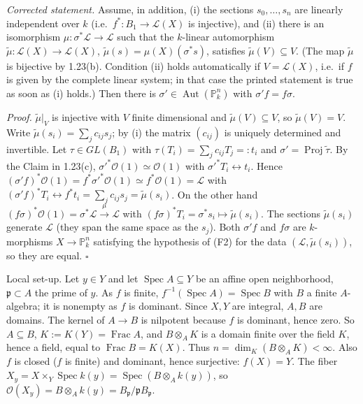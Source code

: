 \documentclass[11pt]{article}
\begin{document}
\emph{Corrected statement.} Assume, in addition, (i) the sections $s_0,\dots,s_n$ are linearly independent over $k$ (i.e.\ $f^*:B_1\to\mathcal{L}(X)$ is injective), and (ii) there is an isomorphism $\mu:\sigma^*\mathcal{L}\to\mathcal{L}$ such that the $k$-linear automorphism $\tilde\mu:\mathcal{L}(X)\to\mathcal{L}(X)$, $\tilde\mu(s)=\mu(X)(\sigma^*s)$, satisfies $\tilde\mu(V)\subseteq V$. (The map $\tilde\mu$ is bijective by 1.23(b). Condition (ii) holds automatically if $V=\mathcal{L}(X)$, i.e.\ if $f$ is given by the complete linear system; in that case the printed statement is true as soon as (i) holds.) Then there is $\sigma'\in\operatorname{Aut}(\mathbb{P}^n_k)$ with $\sigma'f=f\sigma$.

\emph{Proof.} $\tilde\mu|_V$ is injective with $V$ finite dimensional and $\tilde\mu(V)\subseteq V$, so $\tilde\mu(V)=V$. Write $\tilde\mu(s_i)=\sum_jc_{ij}s_j$; by (i) the matrix $(c_{ij})$ is uniquely determined and invertible. Let $\tau\in GL(B_1)$ with $\tau(T_i)=\sum_jc_{ij}T_j=:t_i$ and $\sigma'=\operatorname{Proj}\tilde\tau$. By the Claim in 1.23(c), $\sigma'^*\mathcal{O}(1)\simeq\mathcal{O}(1)$ with $\sigma'^*T_i\leftrightarrow t_i$. Hence $(\sigma'f)^*\mathcal{O}(1)=f^*\sigma'^*\mathcal{O}(1)\simeq f^*\mathcal{O}(1)=\mathcal{L}$ with $(\sigma'f)^*T_i\leftrightarrow f^*t_i=\sum_jc_{ij}s_j=\tilde\mu(s_i)$. On the other hand $(f\sigma)^*\mathcal{O}(1)=\sigma^*\mathcal{L}\xrightarrow{\mu}\mathcal{L}$ with $(f\sigma)^*T_i=\sigma^*s_i\mapsto\tilde\mu(s_i)$. The sections $\tilde\mu(s_i)$ generate $\mathcal{L}$ (they span the same space as the $s_j$). Both $\sigma'f$ and $f\sigma$ are $k$-morphisms $X\to\mathbb{P}^n_k$ satisfying the hypothesis of (F2) for the data $(\mathcal{L},\tilde\mu(s_i))$, so they are equal. \hfill$\square$

\pf
Local set-up. Let $y\in Y$ and let $\operatorname{Spec}A\subseteq Y$ be an affine open neighborhood, $\mathfrak{p}\subset A$ the prime of $y$. As $f$ is finite, $f^{-1}(\operatorname{Spec}A)=\operatorname{Spec}B$ with $B$ a finite $A$-algebra; it is nonempty as $f$ is dominant. Since $X,Y$ are integral, $A,B$ are domains. The kernel of $A\to B$ is nilpotent because $f$ is dominant, hence zero. So $A\subseteq B$, $K:=K(Y)=\operatorname{Frac}A$, and $B\otimes_AK$ is a domain finite over the field $K$, hence a field, equal to $\operatorname{Frac}B=K(X)$. Thus $n=\dim_K(B\otimes_AK)<\infty$. Also $f$ is closed ($f$ is finite) and dominant, hence surjective: $f(X)=Y$. The fiber $X_y=X\times_Y\operatorname{Spec}k(y)=\operatorname{Spec}(B\otimes_Ak(y))$, so $\mathcal{O}(X_y)=B\otimes_Ak(y)=B_\mathfrak{p}/\mathfrak{p}B_\mathfrak{p}$.
\end{document}
